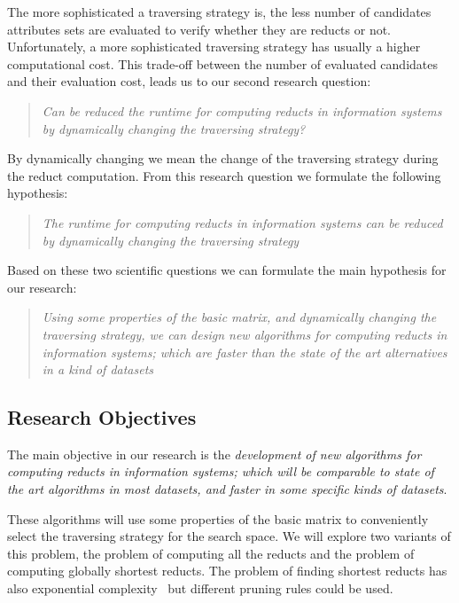 \documentclass[authoryear,11pt]{elsarticle}
\begin{document}
  The more sophisticated a traversing strategy is, the less number of candidates attributes sets are 
  evaluated to verify whether they are reducts or not. Unfortunately, a more sophisticated traversing 
  strategy has usually a higher computational cost. This trade-off between the number of evaluated 
  candidates and their evaluation cost, leads us to our second research question:
  
\begin{quote}
  \emph{Can be reduced the runtime for computing reducts in information systems by 
  		dynamically changing the traversing strategy?}
\end{quote}
  By dynamically changing we mean the change of the traversing strategy during the reduct computation.
  From this research question we formulate the following hypothesis:
    
\begin{quote}
  \emph{The runtime for computing reducts in information systems can be reduced by 
  		dynamically changing the traversing strategy}
\end{quote}

  Based on these two scientific questions we can formulate the main hypothesis for our research:
  
\begin{quote}
  \emph{Using some properties of the basic matrix, and dynamically changing the traversing 
  		strategy, we can design new algorithms for computing reducts in information systems; which are
  		faster than the state of the art alternatives in a kind of datasets}
\end{quote}  

\subsection{Research Objectives}\label{Goals} 
  The main objective in our research is the \emph{development of new algorithms for computing reducts in
  information systems; which will be comparable to state of the art algorithms 
  in most datasets, and faster in some specific kinds of datasets}. 
  
  These algorithms will use some properties 
  of the basic matrix to conveniently select the traversing strategy for the search space. We will explore two
  variants of this problem, the problem of computing all the reducts and the problem of computing globally 
  shortest reducts. The problem of finding shortest reducts has also 
  exponential complexity~\citep{Lin04} but different pruning rules could be used.
  
\end{document}
